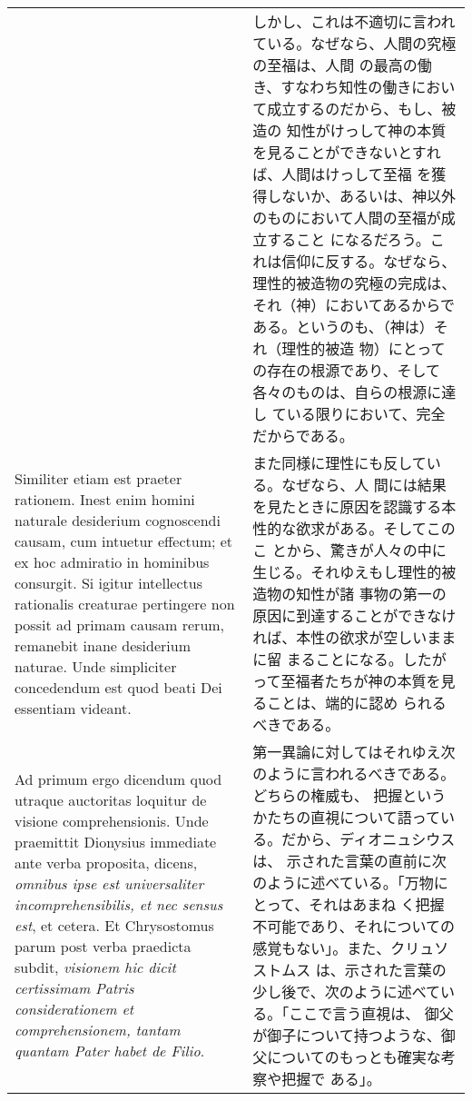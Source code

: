 \documentclass[10pt]{jsarticle} %
\begin{document}
\begin{longtable}{p{21em}p{21em}}
&

しかし、これは不適切に言われている。なぜなら、人間の究極の至福は、人間
の最高の働き、すなわち知性の働きにおいて成立するのだから、もし、被造の
知性がけっして神の本質を見ることができないとすれば、人間はけっして至福
を獲得しないか、あるいは、神以外のものにおいて人間の至福が成立すること
になるだろう。これは信仰に反する。なぜなら、理性的被造物の究極の完成は、
それ（神）においてあるからである。というのも、（神は）それ（理性的被造
 物）にとっての存在の根源であり、そして各々のものは、自らの根源に達し
ている限りにおいて、完全だからである。



\\

Similiter etiam est praeter rationem. Inest enim homini
naturale desiderium cognoscendi causam, cum intuetur effectum; et ex
hoc admiratio in hominibus consurgit. Si igitur intellectus rationalis
creaturae pertingere non possit ad primam causam rerum, remanebit
inane desiderium naturae. Unde simpliciter concedendum est quod beati
Dei essentiam videant.

&

また同様に理性にも反している。なぜなら、人
間には結果を見たときに原因を認識する本性的な欲求がある。そしてこのこ
とから、驚きが人々の中に生じる。それゆえもし理性的被造物の知性が諸
事物の第一の原因に到達することができなければ、本性の欲求が空しいままに留
まることになる。したがって至福者たちが神の本質を見ることは、端的に認め
られるべきである。

\\

{\sc  Ad primum ergo dicendum} quod utraque auctoritas loquitur de
 visione comprehensionis. Unde praemittit Dionysius immediate ante verba
 proposita, dicens, {\it omnibus ipse est universaliter incomprehensibilis,
 et nec sensus est}, et cetera. Et Chrysostomus parum post verba
 praedicta subdit, {\it visionem hic dicit certissimam Patris considerationem
 et comprehensionem, tantam quantam Pater habet de Filio}.

&

第一異論に対してはそれゆえ次のように言われるべきである。どちらの権威も、
把握というかたちの直視について語っている。だから、ディオニュシウスは、
示された言葉の直前に次のように述べている。「万物にとって、それはあまね
く把握不可能であり、それについての感覚もない」。また、クリュソストムス
は、示された言葉の少し後で、次のように述べている。「ここで言う直視は、
御父が御子について持つような、御父についてのもっとも確実な考察や把握で
ある」。


\end{longtable}
\end{document}
